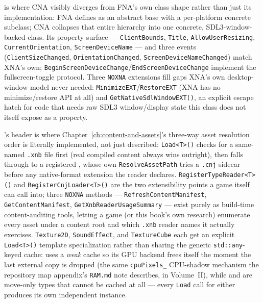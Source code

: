  is where CNA visibly diverges from FNA's own class shape rather than just
its implementation: FNA defines  as an abstract base with a per-platform
concrete subclass; CNA collapses that entire hierarchy into one concrete, SDL3-window-backed
class. Its property surface --- \texttt{ClientBounds}, \texttt{Title},
\texttt{AllowUserResizing}, \texttt{CurrentOrientation}, \texttt{ScreenDeviceName} --- and three
events (\texttt{ClientSizeChanged}, \texttt{OrientationChanged}, \texttt{ScreenDeviceNameChanged})
match XNA's own; \texttt{BeginScreenDeviceChange}/\texttt{EndScreenDeviceChange} implement the
fullscreen-toggle protocol. Three \texttt{NOXNA} extensions fill gaps XNA's own desktop-window
model never needed: \texttt{MinimizeEXT}/\texttt{RestoreEXT} (XNA has no minimize/restore API at
all) and \texttt{GetNativeSdlWindowEXT()}, an explicit escape hatch for code that needs raw SDL3
window/display state this class does not itself expose as a property.

's header is where Chapter~\ref{ch:content-and-assets}'s three-way
asset resolution order is literally implemented, not just described: \texttt{Load<T>()} checks
for a same-named \texttt{.xnb} file first (real compiled content always wins outright), then
falls through to a registered , whose own
\texttt{ResolveAssetPath} tries a \texttt{.cnj} sidecar before any native-format extension the
reader declares. \texttt{RegisterTypeReader<T>()} and \texttt{RegisterCnjLoader<T>()} are the two
extensibility points a game itself can call into; three \texttt{NOXNA} methods ---
\texttt{RefreshContentManifest}, \texttt{GetContentManifest}, \texttt{GetXnbReaderUsageSummary}
--- exist purely as build-time content-auditing tools, letting a game (or this book's own
research) enumerate every asset under a content root and which \texttt{.xnb} reader names it
actually exercises. \texttt{Texture2D}, \texttt{SoundEffect}, and \texttt{TextureCube} each get
an explicit \texttt{Load<T>()} template specialization rather than sharing the generic
\texttt{std::any}-keyed cache:  uses a \emph{weak} cache so its GPU backend
frees itself the moment the last external copy is dropped (the same \texttt{cpuPixels\_}
CPU-shadow mechanism the repository map appendix's \texttt{RAM.md} note describes, in
Volume~II), while  and  are move-only types that
cannot be cached at all --- every \texttt{Load} call for either produces its own independent
instance.

